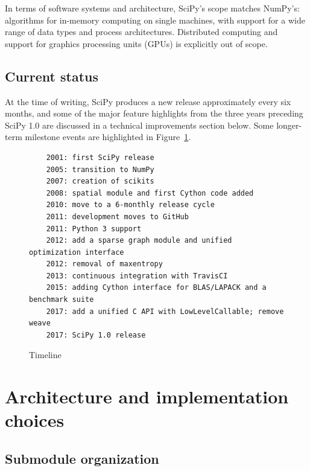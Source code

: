 \documentclass[fleqn,10pt]{wlscirep}
\begin{document}
In terms of software systems and architecture, SciPy's scope matches NumPy's:
algorithms for in-memory computing on single machines, with support for a wide
range of data types and process architectures. Distributed computing and support
for graphics processing units (GPUs) is explicitly out of scope.

\subsection*{Current status}

At the time of writing, SciPy produces a new release
approximately every six months, and some of the major
feature highlights from the three years preceding
SciPy 1.0 are discussed in a technical improvements
section below. Some longer-term milestone events are
highlighted in Figure~\ref{fig:timeline}.

\begin{figure}[H]
\begin{verbatim}
    2001: first SciPy release
    2005: transition to NumPy
    2007: creation of scikits
    2008: spatial module and first Cython code added
    2010: move to a 6-monthly release cycle
    2011: development moves to GitHub
    2011: Python 3 support
    2012: add a sparse graph module and unified optimization interface
    2012: removal of maxentropy
    2013: continuous integration with TravisCI
    2015: adding Cython interface for BLAS/LAPACK and a benchmark suite
    2017: add a unified C API with LowLevelCallable; remove weave
    2017: SciPy 1.0 release
\end{verbatim}
\caption{Timeline}
\label{fig:timeline}
\end{figure}






\section*{Architecture and implementation choices}

\subsection*{Submodule organization}
\end{document}
